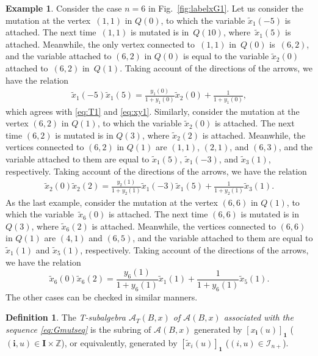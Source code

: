 \documentclass[11pt]{article}
\numberwithin{equation}{section}
\theoremstyle{definition}
\newtheorem{Definition}[Theorem]{Definition}
\newtheorem{Example}[Theorem]{Example}
\begin{document}
\begin{Example}
Consider the case $n=6$ in Fig.~\ref{fig:labelxG1}.
Let us consider the mutation at the vertex~$(1,1)$ in $Q(0)$,
to which  the variable $\tilde{x}_1(-5)$ is attached.
The next time~$(1,1)$ is mutated is in~$Q(10)$,
where~$\tilde{x}_1(5)$ is attached.
Meanwhile, the only vertex connected to~$(1,1)$ in~$Q(0)$ is~$(6,2)$,
and the  variable attached to $(6,2)$ in $Q(0)$ is equal to
the variable  $\tilde{x}_2(0)$ attached to~$(6,2)$ in~$Q(1)$.
Taking account of the directions of the arrows,
we have the  relation
\begin{align*}
\tilde{x}_1(-5)\tilde{x}_1(5)=
\frac{y_1(0)}{1+y_1(0)} \tilde{x}_2(0)
+ \frac{1}{1+y_1(0)} ,
\end{align*}
which agrees with
\eqref{eq:T1} and
\eqref{eq:xy1}.
Similarly, consider the mutation at the vertex $(6,2)$ in $Q(1)$,
to which  the variable $\tilde{x}_2(0)$ is attached.
The next time $(6,2)$ is mutated is in $Q(3)$,
where $\tilde{x}_2(2)$ is attached.
Meanwhile, the vertices connected to $(6,2)$ in $Q(1)$
are $(1,1)$, $(2,1)$, and $(6,3)$,
and the  variable attached to them are equal to
$\tilde{x}_1(5)$, $\tilde{x}_1(-3)$, and $\tilde{x}_3(1)$, respectively.
Taking account of the directions of the arrows,
we have the relation
\begin{align*}
\tilde{x}_2(0)\tilde{x}_2(2)=
\frac{y_2(1)}{1+y_2(1)} \tilde{x}_1(-3)\tilde{x}_1(5)
+ \frac{1}{1+y_2(1)} \tilde{x}_3(1).
\end{align*}
As the last example,
consider the mutation at the vertex $(6,6)$ in $Q(1)$,
to which  the va\-riab\-le~$\tilde{x}_6(0)$ is attached.
The next time $(6,6)$ is mutated is in $Q(3)$,
where $\tilde{x}_6(2)$ is attached.
Meanwhile, the vertices connected to $(6,6)$ in $Q(1)$
are $(4,1)$ and $(6,5)$,
and the  variable attached to them are equal to
$\tilde{x}_1(1)$ and  $\tilde{x}_5(1)$, respectively.
Taking account of the directions of the arrows,
we have the relation
\[
\tilde{x}_6(0)\tilde{x}_6(2)=
\frac{y_6(1)}{1+y_6(1)} \tilde{x}_1(1)
+ \frac{1}{1+y_6(1)} \tilde{x}_5(1).
\]
The other cases can be checked in similar manners.
\end{Example}

\begin{Definition}
\label{def:T-sub}
The {\em T-subalgebra
$\mathcal{A}_T(B,x)$
of ${\mathcal{A}}(B,x)$
associated with the sequence \eqref{eq:Gmutseq}}
is the subring of
${\mathcal{A}}(B,x)$
generated by
$[x_{\mathbf{i}}(u)]_{\mathbf{1}}$
($(\mathbf{i},u)\in \mathbf{I}\times \mathbb{Z}$),
or equivalently,
generated by
$[\tilde{x}_{i}(u)]_{\mathbf{1}}$
($(i,u)\in \mathcal{I}_{n+}$).
\end{Definition}
\end{document}
